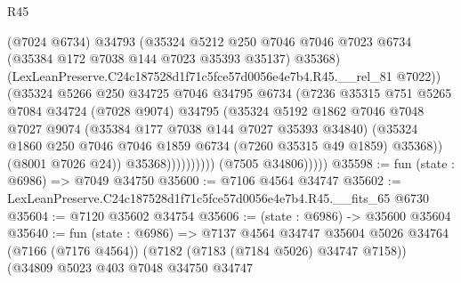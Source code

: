 \begin{lexlean}{R45}
\begin{coremodule}
{                                (@7024 @6734)
                                @34793
                                (@35324
                                  @5212
                                  @250
                                  @7046
                                  @7046
                                  @7023
                                  @6734
                                  (@35384 @172 @7038 @144 @7023 @35393 @35137)
                                  @35368)
                                (LexLeanPreserve.C24c187528d1f71c5fce57d0056e4e7b4.R45.__rel_81
                                  @7022))
                              (@35324
                                @5266
                                @250
                                @34725
                                @7046
                                @34795
                                @6734
                                (@7236
                                  @35315
                                  @751
                                  @5265
                                  @7084
                                  @34724
                                  (@7028 @9074)
                                  @34795
                                  (@35324
                                    @5192
                                    @1862
                                    @7046
                                    @7048
                                    @7027
                                    @9074
                                    (@35384 @177 @7038 @144 @7027 @35393 @34840)
                                    (@35324
                                      @1860
                                      @250
                                      @7046
                                      @7046
                                      @1859
                                      @6734
                                      (@7260 @35315 @49 @1859)
                                      @35368))
                                  (@8001 @7026 @24))
                                @35368))))))))))
            (@7505 @34806)))))
@35598 := fun (state : @6986) => @7049 @34750
@35600 := @7106 @4564 @34747
@35602 := LexLeanPreserve.C24c187528d1f71c5fce57d0056e4e7b4.R45.__fits_65 @6730
@35604 := @7120 @35602 @34754
@35606 := (state : @6986) -> @35600 @35604
@35640 := fun (state : @6986) =>
  @7137
    @4564
    @34747
    @35604
    @5026
    @34764
    (@7166 (@7176 @4564))
    (@7182 (@7183 (@7184 @5026) @34747 @7158))
    (@34809
      @5023
      @403
      @7048
      @34750
      @34747
}
\end{coremodule}
\end{lexlean}
